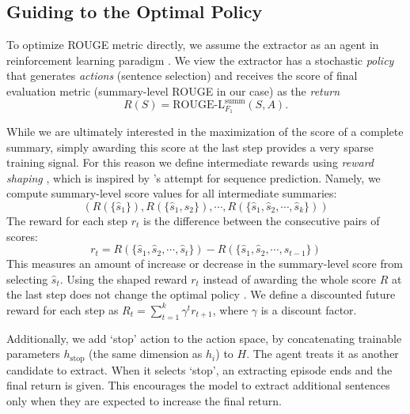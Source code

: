 \documentclass[11pt,a4paper]{article}
\begin{document}
\subsection{Guiding to the Optimal Policy}

To optimize ROUGE metric directly, we assume the extractor
as an agent in reinforcement learning paradigm \cite{sutton1998introduction}.
We view the extractor has a stochastic \emph{policy} that generates
\emph{actions} (sentence selection) and receives the score of final evaluation metric
(summary-level ROUGE in our case) as the \emph{return}
\begin{equation}
\label{eq:}
R(S)=\text{ROUGE-L}^{\text{summ}}_{F_1}(S, A).
\end{equation}

While we are ultimately interested in the maximization of the
score of a complete summary, simply awarding this score at the
last step provides a very sparse training signal.
For this reason we define intermediate rewards using
\emph{reward shaping} \cite{Ng:1999:PIU:645528.657613},
which is inspired by \citet{DBLP:conf/iclr/BahdanauBXGLPCB17}'s attempt for sequence prediction.
Namely, we compute summary-level score values for all intermediate
summaries:
\begin{equation}
\label{eq:}
(R(\{\hat{s}_1\}),R(\{\hat{s}_1,\hat{s}_2\}),\cdots,R(\{\hat{s}_1,\hat{s}_2,\cdots,\hat{s}_k\}))
\end{equation}
The reward for each step $r_t$ is the difference between the consecutive pairs of scores:
\begin{equation}
\label{eq:}
r_t = R(\{\hat{s}_1,\hat{s}_2,\cdots,\hat{s}_t\}) - R(\{\hat{s}_1,\hat{s}_2,\cdots,\hat{s}_{t-1}\})
\end{equation}
This measures an amount of increase or decrease in the
summary-level score from selecting $\hat{s}_t$.
Using the shaped reward $r_t$ instead of awarding the whole score
$R$ at the last step does not change the optimal policy \cite{Ng:1999:PIU:645528.657613}.
We define a discounted future reward for each step as
$R_t=\sum_{t=1}^{k}\gamma^tr_{t+1}$, where $\gamma$ is a discount factor.

Additionally, we add `stop' action to the action space, by concatenating
trainable parameters $h_{\text{stop}}$ (the same dimension as $h_i$)
to $H$. The agent treats it as another candidate to extract. When it selects
`stop', an extracting episode ends and the final return is given.
This encourages the model to extract additional sentences only when they
are expected to increase the final return.
\end{document}

